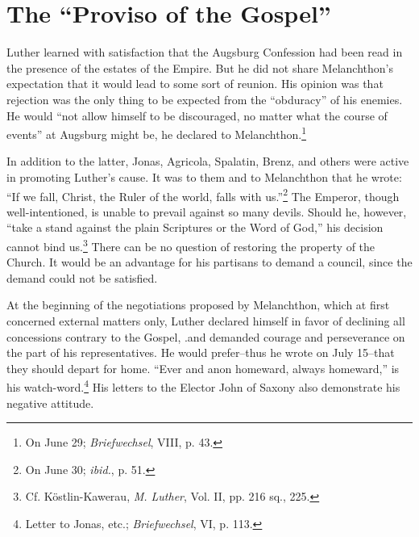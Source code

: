 \section{The “Proviso of the Gospel”}

Luther learned with satisfaction that the Augsburg Confession had
been read in the presence of the estates of the Empire. But he did not
share Melanchthon’s expectation that it would lead to some sort of
reunion. His opinion was that rejection was the only thing to be expected
from the “obduracy” of his enemies. He would “not allow
himself to be discouraged, no matter what the course of events” at
Augsburg might be, he declared to Melanchthon.\footnote{On June 29; \textit{Briefwechsel}, VIII, p. 43.}

In addition to the latter, Jonas, Agricola, Spalatin, Brenz, and
others were active in promoting Luther’s cause. It was to them and to
Melanchthon that he wrote: “If we fall, Christ, the Ruler of the
world, falls with us.”\footnote{On June 30; \textit{ibid.}, p. 51.}
 The Emperor, though well-intentioned, is
unable to prevail against so many devils. Should he, however, “take a
stand against the plain Scriptures or the Word of God,” his decision
cannot bind us.\footnote{Cf. Köstlin-Kawerau, \textit{M. Luther}, Vol. II, pp. 216 sq., 225.}
 There can be no question of restoring the property
of the Church. It would be an advantage for his partisans to demand
a council, since the demand could not be satisfied.

At the beginning of the negotiations proposed by Melanchthon,
which at first concerned external matters only, Luther declared himself
in favor of declining all concessions contrary to the Gospel, .and
demanded courage and perseverance on the part of his representatives.
He would prefer--thus he wrote on July 15--that they should depart for
home. “Ever and anon homeward, always homeward,” is his
watch-word.\footnote{Letter to Jonas, etc.; \textit{Briefwechsel}, VI, p. 113.}
 His letters to the Elector John of Saxony also demonstrate
his negative attitude.

